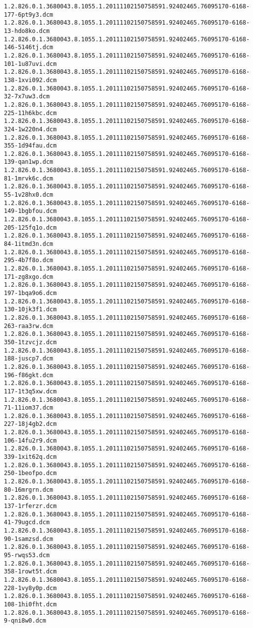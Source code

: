 \begin{lstlisting}
1.2.826.0.1.3680043.8.1055.1.20111102150758591.92402465.76095170-6168-177-6pt9y3.dcm 1.2.826.0.1.3680043.8.1055.1.20111102150758591.92402465.76095170-6168-13-hdo8ko.dcm 1.2.826.0.1.3680043.8.1055.1.20111102150758591.92402465.76095170-6168-146-5146tj.dcm 1.2.826.0.1.3680043.8.1055.1.20111102150758591.92402465.76095170-6168-101-1u87uvi.dcm 1.2.826.0.1.3680043.8.1055.1.20111102150758591.92402465.76095170-6168-138-1xvi092.dcm 1.2.826.0.1.3680043.8.1055.1.20111102150758591.92402465.76095170-6168-32-7x7uw3.dcm 1.2.826.0.1.3680043.8.1055.1.20111102150758591.92402465.76095170-6168-225-11h6kbc.dcm 1.2.826.0.1.3680043.8.1055.1.20111102150758591.92402465.76095170-6168-324-1w220n4.dcm 1.2.826.0.1.3680043.8.1055.1.20111102150758591.92402465.76095170-6168-355-1d94fau.dcm 1.2.826.0.1.3680043.8.1055.1.20111102150758591.92402465.76095170-6168-139-qan1wp.dcm 1.2.826.0.1.3680043.8.1055.1.20111102150758591.92402465.76095170-6168-81-1mrvk6c.dcm 1.2.826.0.1.3680043.8.1055.1.20111102150758591.92402465.76095170-6168-55-1v28hx0.dcm 1.2.826.0.1.3680043.8.1055.1.20111102150758591.92402465.76095170-6168-149-1bgbfou.dcm 1.2.826.0.1.3680043.8.1055.1.20111102150758591.92402465.76095170-6168-205-125fq1o.dcm 1.2.826.0.1.3680043.8.1055.1.20111102150758591.92402465.76095170-6168-84-1itmd3n.dcm 1.2.826.0.1.3680043.8.1055.1.20111102150758591.92402465.76095170-6168-295-4b7f8o.dcm 1.2.826.0.1.3680043.8.1055.1.20111102150758591.92402465.76095170-6168-171-zg8xgo.dcm 1.2.826.0.1.3680043.8.1055.1.20111102150758591.92402465.76095170-6168-197-1bqa9o6.dcm 1.2.826.0.1.3680043.8.1055.1.20111102150758591.92402465.76095170-6168-130-10jk3f1.dcm 1.2.826.0.1.3680043.8.1055.1.20111102150758591.92402465.76095170-6168-263-raa3rw.dcm 1.2.826.0.1.3680043.8.1055.1.20111102150758591.92402465.76095170-6168-350-1tzvcjz.dcm 1.2.826.0.1.3680043.8.1055.1.20111102150758591.92402465.76095170-6168-188-juscp7.dcm 1.2.826.0.1.3680043.8.1055.1.20111102150758591.92402465.76095170-6168-196-f86gkt.dcm 1.2.826.0.1.3680043.8.1055.1.20111102150758591.92402465.76095170-6168-117-1t3q5xw.dcm 1.2.826.0.1.3680043.8.1055.1.20111102150758591.92402465.76095170-6168-71-11iom37.dcm 1.2.826.0.1.3680043.8.1055.1.20111102150758591.92402465.76095170-6168-227-18j4gb2.dcm 1.2.826.0.1.3680043.8.1055.1.20111102150758591.92402465.76095170-6168-106-14fu2r9.dcm 1.2.826.0.1.3680043.8.1055.1.20111102150758591.92402465.76095170-6168-339-1xit62q.dcm 1.2.826.0.1.3680043.8.1055.1.20111102150758591.92402465.76095170-6168-250-1beofpo.dcm 1.2.826.0.1.3680043.8.1055.1.20111102150758591.92402465.76095170-6168-80-16mrgrn.dcm 1.2.826.0.1.3680043.8.1055.1.20111102150758591.92402465.76095170-6168-137-1rferzr.dcm 1.2.826.0.1.3680043.8.1055.1.20111102150758591.92402465.76095170-6168-41-79ugcd.dcm 1.2.826.0.1.3680043.8.1055.1.20111102150758591.92402465.76095170-6168-90-1samzsd.dcm 1.2.826.0.1.3680043.8.1055.1.20111102150758591.92402465.76095170-6168-95-rwqs53.dcm 1.2.826.0.1.3680043.8.1055.1.20111102150758591.92402465.76095170-6168-358-1rowt5t.dcm 1.2.826.0.1.3680043.8.1055.1.20111102150758591.92402465.76095170-6168-228-1vy8y0p.dcm 1.2.826.0.1.3680043.8.1055.1.20111102150758591.92402465.76095170-6168-108-1hi0fht.dcm 1.2.826.0.1.3680043.8.1055.1.20111102150758591.92402465.76095170-6168-9-qni8w0.dcm 
\end{lstlisting}
